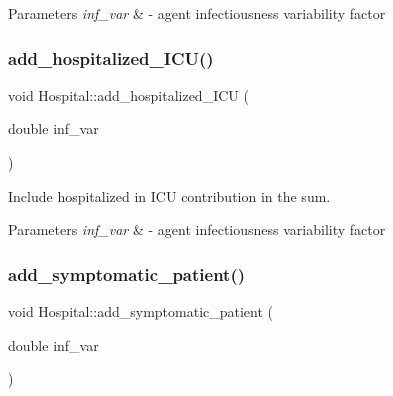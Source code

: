 \begin{DoxyParams}{Parameters}
{\em inf\+\_\+var} & -\/ agent infectiousness variability factor \\
\hline
\end{DoxyParams}
\mbox{\label{classHospital_a5a59a3e88cd740b32c8829f31a51f47c}} 
\subsubsection{\texorpdfstring{add\+\_\+hospitalized\+\_\+\+I\+C\+U()}{add\_hospitalized\_ICU()}}
{\footnotesize\ttfamily void Hospital\+::add\+\_\+hospitalized\+\_\+\+I\+CU (\begin{DoxyParamCaption}\item[{double}]{inf\+\_\+var }\end{DoxyParamCaption})\hspace{0.3cm}{\ttfamily [inline]}}



Include hospitalized in I\+CU contribution in the sum. 


\begin{DoxyParams}{Parameters}
{\em inf\+\_\+var} & -\/ agent infectiousness variability factor \\
\hline
\end{DoxyParams}
\mbox{\label{classHospital_aa33d0902fa7c16cb04e0652cadfcd946}} 
\subsubsection{\texorpdfstring{add\+\_\+symptomatic\+\_\+patient()}{add\_symptomatic\_patient()}}
{\footnotesize\ttfamily void Hospital\+::add\+\_\+symptomatic\+\_\+patient (\begin{DoxyParamCaption}\item[{double}]{inf\+\_\+var }\end{DoxyParamCaption})\hspace{0.3cm}{\ttfamily [inline]}}



